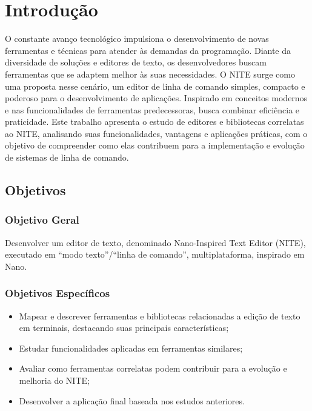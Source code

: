 \chapter{Introdução}
\label{cap:01}

O constante avanço tecnológico impulsiona o desenvolvimento de novas ferramentas e técnicas para atender às demandas da programação. Diante da diversidade de soluções e editores de texto, os desenvolvedores buscam ferramentas que se adaptem melhor às suas necessidades. O NITE surge como uma proposta nesse cenário, um editor de linha de comando simples, compacto e poderoso para o desenvolvimento de aplicações. Inspirado em conceitos modernos e nas funcionalidades de ferramentas predecessoras, busca combinar eficiência e praticidade. Este trabalho apresenta o estudo de editores e bibliotecas correlatas ao NITE, analisando suas funcionalidades, vantagens e aplicações práticas, com o objetivo de compreender como elas contribuem para a implementação e evolução de sistemas de linha de comando.

\section{Objetivos}

\subsection{Objetivo Geral}

Desenvolver um editor de texto, denominado Nano-Inspired Text Editor (NITE), executado em ``modo texto''/``linha de comando'', multiplataforma, inspirado em Nano.

\subsection{Objetivos Específicos}
\begin{itemize}
    \item Mapear e descrever ferramentas e bibliotecas relacionadas a edição de texto em terminais, destacando suas principais características;
    \item Estudar funcionalidades aplicadas em ferramentas similares;
    \item Avaliar como ferramentas correlatas podem contribuir para a evolução e melhoria do NITE;
    \item Desenvolver a aplicação final baseada nos estudos anteriores.
\end{itemize}
